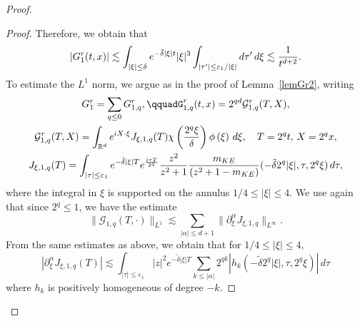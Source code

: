 \documentclass[11pt]{amsart}
\numberwithin{equation}{section}
\newcommand{\eps}{\varepsilon}
\begin{document}
\begin{proof}
\begin{proof}
   Therefore, we obtain that
   $$   |G^r_{1}(t,x)| \lesssim   \int_{| \xi | \leq \delta}  e^{ - \tilde \delta | \xi | t} |\xi|^3   \int_{|\tau' | \leq \eps_{1}/|\xi|} 
    d\tau' \, d\xi \lesssim { 1 \over t^{d+2}}.$$
     To estimate the $L^1$ norm, we argue as in the proof of Lemma~\ref{lemGr2}, 
      writing
      \begin{multline}
   \label{G1rLP} G_{1}^r = \sum_{q \leq 0} G^r_{1,q},  \qquad%
 G^r_{1, q}(t,x) = 2^{qd} \mathcal{G}^r_{1,q} (T, X), \\
  \mathcal{G}^r_{1,q} (T, X)
  = \int_{\mathbb{R}^d}  e^{i X \cdot \xi} J_{\xi, 1,q} (T)   \chi \left( { 2^q  \xi \over \delta} \right)   \phi \left(  \xi \right)\, d \xi, 
  \quad  T= 2^qt, \, X= 2^q x,\\
   J_{\xi, 1, q}(T)=
    \int_{ | \tau |  \leq \eps_{1} }e^{-  \tilde \delta |\xi| T}  e^{i \tau T \over 2^q}  {z^2 \over z^2+1}   { m_{KE} \over (z^2+ 1 - m_{KE})}(
    - \tilde \delta 2^q | \xi |,  \tau,  
    2^q  \xi )\, d\tau,
    \end{multline} 
    where  the integral in $\xi$ is supported on the annulus $ 1/4 \leq | \xi | \leq 4.$
    We use again  that since $2^q \leq 1$, we have the estimate 
    $$ \| \mathcal{G}_{1,q} (T, \cdot)\|_{L^1}
     \lesssim  \sum_{ | \alpha | \leq d+1}   \| \partial_{\xi}^\alpha J_{\xi, 1, q}\|_{L^\infty}.$$
     From the same estimates as above, we obtain 
       that for $1/4 \leq | \xi | \leq 4$, 
       $$    | \partial_{\xi}^\alpha J_{\xi, 1, q}(T) | \lesssim  \int_{ | \tau |  \leq \eps_{1} } |z|^2 e^{-  \tilde \delta |\xi| T} 
         \sum_{k \leq | \alpha |} 2^{qk} | h_{k} ( - \tilde \delta 2^q | \xi |,  \tau,  
    2^q  \xi )  |\, d\tau$$
    where $h_{k}$ is positively homogeneous of degree $-k$. 

\end{proof}
\end{proof}
\end{document}
